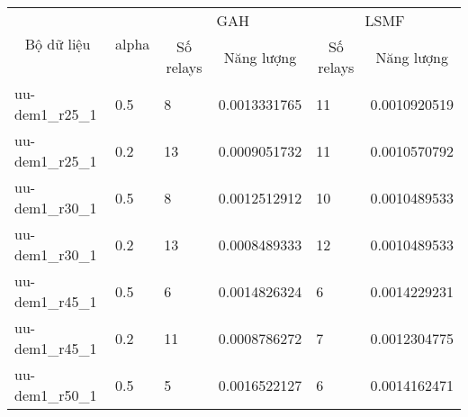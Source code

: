 \begin{table}[]
    \begin{tabular}{|l|l|l|l|l|l|}
    \hline
    \multicolumn{1}{|c|}{\multirow{2}{*}{Bộ dữ liệu}} & \multicolumn{1}{c|}{\multirow{2}{*}{alpha}} & \multicolumn{2}{c|}{GAH}                                         & \multicolumn{2}{c|}{LSMF}                                        \\ \cline{3-6} 
    \multicolumn{1}{|c|}{}                            & \multicolumn{1}{c|}{}                       & \multicolumn{1}{c|}{Số relays} & \multicolumn{1}{c|}{Năng lượng} & \multicolumn{1}{c|}{Số relays} & \multicolumn{1}{c|}{Năng lượng} \\ \hline
    uu-dem1\_r25\_1                                & 0.5                                         & 8                              & 0.0013331765                    & 11                             & 0.0010920519                    \\ \hline
    uu-dem1\_r25\_1                                & 0.2                                         & 13                             & 0.0009051732                    & 11                             & 0.0010570792                    \\ \hline
    uu-dem1\_r30\_1                                & 0.5                                         & 8                              & 0.0012512912                    & 10                             & 0.0010489533                    \\ \hline
    uu-dem1\_r30\_1                                & 0.2                                         & 13                             & 0.0008489333                    & 12                             & 0.0010489533                    \\ \hline
    uu-dem1\_r45\_1                                & 0.5                                         & 6                              & 0.0014826324                    & 6                              & 0.0014229231                    \\ \hline
    uu-dem1\_r45\_1                                & 0.2                                         & 11                             & 0.0008786272                    & 7                              & 0.0012304775                    \\ \hline
    uu-dem1\_r50\_1                                & 0.5                                         & 5                              & 0.0016522127                    & 6                              & 0.0014162471                    \\ \hline

\end{tabular}
\end{table}
